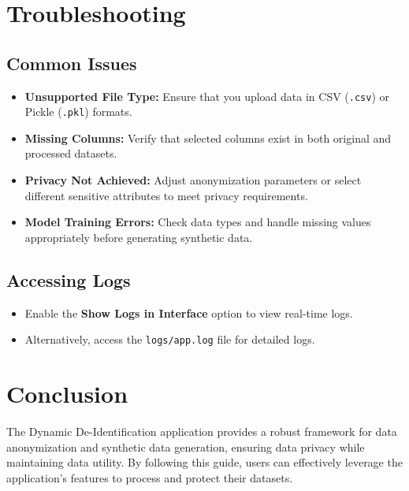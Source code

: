 \documentclass[12pt,a4paper]{article}
\begin{document}
\section{Troubleshooting}
\subsection{Common Issues}
\begin{itemize}
    \item \textbf{Unsupported File Type:} Ensure that you upload data in CSV (\texttt{.csv}) or Pickle (\texttt{.pkl}) formats.
    \item \textbf{Missing Columns:} Verify that selected columns exist in both original and processed datasets.
    \item \textbf{Privacy Not Achieved:} Adjust anonymization parameters or select different sensitive attributes to meet privacy requirements.
    \item \textbf{Model Training Errors:} Check data types and handle missing values appropriately before generating synthetic data.
\end{itemize}

\subsection{Accessing Logs}
\begin{itemize}
    \item Enable the \textbf{Show Logs in Interface} option to view real-time logs.
    \item Alternatively, access the \texttt{logs/app.log} file for detailed logs.
\end{itemize}

\section{Conclusion}
The Dynamic De-Identification application provides a robust framework for data anonymization and synthetic data generation, ensuring data privacy while maintaining data utility. By following this guide, users can effectively leverage the application's features to process and protect their datasets.
\end{document}
